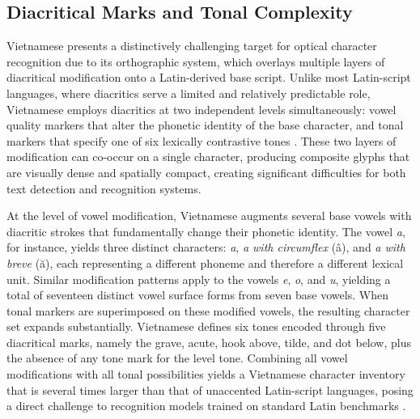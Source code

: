 \subsection{Diacritical Marks and Tonal Complexity}
\label{sec:diacritical_marks_and_tonal_complexity}
Vietnamese presents a distinctively challenging target for optical character recognition due to its orthographic system, which overlays multiple layers of diacritical modification onto a Latin-derived base script. Unlike most Latin-script languages, where diacritics serve a limited and relatively predictable role, Vietnamese employs diacritics at two independent levels simultaneously: vowel quality markers that alter the phonetic identity of the base character, and tonal markers that specify one of six lexically contrastive tones \cite{Nguyen2012}. These two layers of modification can co-occur on a single character, producing composite glyphs that are visually dense and spatially compact, creating significant difficulties for both text detection and recognition systems.

At the level of vowel modification, Vietnamese augments several base vowels with diacritic strokes that fundamentally change their phonetic identity. The vowel \textit{a}, for instance, yields three distinct characters: \textit{a}, \textit{a with circumflex} (â), and \textit{a with breve} (ă), each representing a different phoneme and therefore a different lexical unit. Similar modification patterns apply to the vowels \textit{e}, \textit{o}, and \textit{u}, yielding a total of seventeen distinct vowel surface forms from seven base vowels. When tonal markers are superimposed on these modified vowels, the resulting character set expands substantially. Vietnamese defines six tones encoded through five diacritical marks, namely the grave, acute, hook above, tilde, and dot below, plus the absence of any tone mark for the level tone. Combining all vowel modifications with all tonal possibilities yields a Vietnamese character inventory that is several times larger than that of unaccented Latin-script languages, posing a direct challenge to recognition models trained on standard Latin benchmarks \cite{Nguyen2021}.

